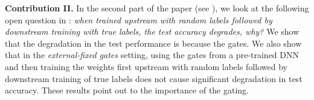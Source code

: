 \textbf{Contribution II.} In the second part of the paper (see ), we look at the following open question in \citep{randlabel}: \emph{when trained upstream with random labels followed by downstream training with true labels, the test accuracy degrades, why?} We show that the degradation in the test performance is because the gates. We also show that in the \emph{external-fixed gates} setting, using the gates from a pre-trained DNN and then training the weights first upstream with random labels followed by downstream training of true labels does not cause significant degradation in test accuracy. These results point out to the importance of the gating.






